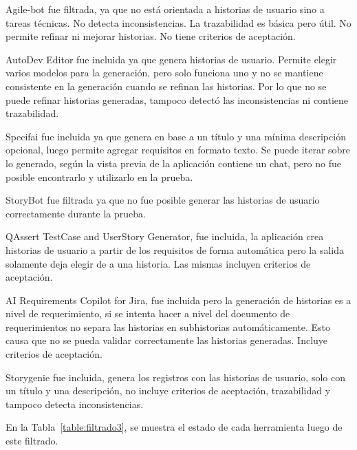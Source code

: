 Agile-bot fue filtrada, ya que no está orientada a historias de usuario sino a tareas técnicas. No detecta inconsistencias. La trazabilidad es básica pero útil. No permite refinar ni mejorar historias. No tiene criterios de aceptación.

AutoDev Editor fue incluida ya que genera historias de usuario. Permite elegir varios modelos para la generación, pero solo funciona uno y no se mantiene consistente en la generación cuando se refinan las historias. Por lo que no se puede refinar historias generadas, tampoco detectó las inconsistencias ni contiene trazabilidad.

Specifai fue incluida ya que genera en base a un título y una mínima descripción opcional, luego permite agregar requisitos en formato texto. Se puede iterar sobre lo generado, según la vista previa de la aplicación contiene un chat, pero no fue posible encontrarlo y utilizarlo en la prueba.

StoryBot fue filtrada ya que no fue posible generar las historias de usuario correctamente durante la prueba.

QAssert TestCase and UserStory Generator, fue incluida, la aplicación crea historias de usuario a partir de los requisitos de forma automática pero la salida solamente deja elegir de a una historia. Las mismas incluyen criterios de aceptación.

AI Requirements Copilot for Jira, fue incluida pero la generación de historias es a nivel de requerimiento, si se intenta hacer a nivel del documento de requerimientos no separa las historias en subhistorias automáticamente. Esto causa que no se pueda validar correctamente las historias generadas. Incluye criterios de aceptación.

Storygenie fue incluida, genera los registros con las historias de usuario, solo con un título y una descripción, no incluye criterios de aceptación, trazabilidad y tampoco detecta inconsistencias.

En la Tabla~\ref{table:filtrado3}, se muestra el estado de cada herramienta luego de este filtrado.

